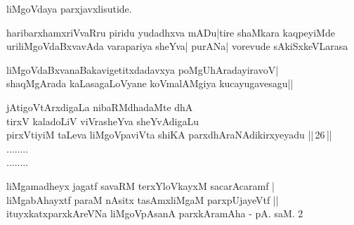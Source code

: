 \begin{entry}
\gl{}
\begin{shl}
liMgoVdaya parxjavxlisutide.
\end{shl}
\end{entry}

\begin{entry}
\end{entry}

\begin{entry}
\begin{shl}
haribarxhamxriVvaRru piridu yudadhxva mADu|tire shaMkara kaqpeyiMde\\
uriliMgoVdaBxvavAda varapariya sheYva| purANa| vorevude sAkiSxkeVLarasa
\end{shl}
\begin{shl}
liMgoVdaBxvanaBakavigetitxdadavxya poMgUhAradayiravoV|\\
 shaqMgArada kaLasagaLoVyane koVmalAMgiya kucayugavesagu||
\end{shl}
\end{entry}

\begin{entry}
\begin{shl}
jAtigoVtArxdigaLa nibaRMdhadaMte dhA\\
tirxV kaladoLiV viVrasheYva sheYvAdigaLu\\
pirxVtiyiM taLeva liMgoVpaviVta shiKA parxdhAraNAdikirxyeyadu
||\,26\,||\\
........\\
........
\end{shl}
\end{entry}

\begin{entry}
\gl{}
\begin{shl}
liMgamadheyx jagatf savaRM terxYloVkayxM sacarAcaramf |\\
liMgabAhayxtf paraM nAsitx tasAmxliMgaM parxpUjayeVtf ||\\
ituyxkatxparxkAreVNa liMgoVpAsanA parxkAramAha - pA. saM. 2
\end{shl}
\end{entry}


